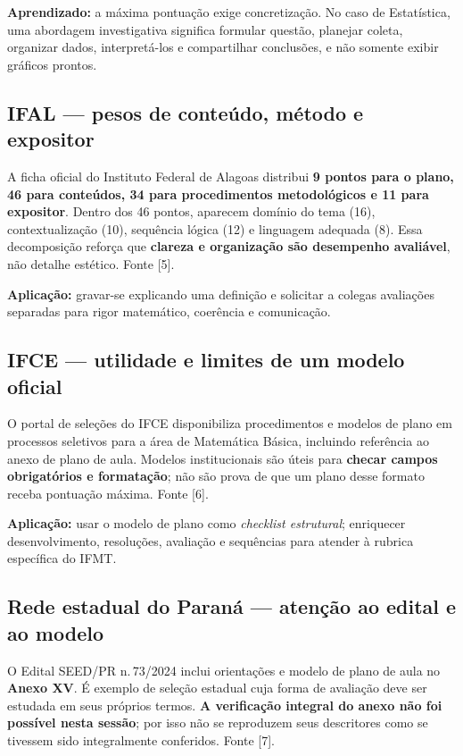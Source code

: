 \documentclass[11pt,a4paper]{article}
\begin{document}
\textbf{Aprendizado:} a máxima pontuação exige concretização. No caso de Estatística, uma abordagem investigativa significa formular questão, planejar coleta, organizar dados, interpretá-los e compartilhar conclusões, e não somente exibir gráficos prontos.

\subsection{IFAL --- pesos de conteúdo, método e expositor}
A ficha oficial do Instituto Federal de Alagoas distribui \textbf{9 pontos para o plano, 46 para conteúdos, 34 para procedimentos metodológicos e 11 para expositor}. Dentro dos 46 pontos, aparecem domínio do tema (16), contextualização (10), sequência lógica (12) e linguagem adequada (8). Essa decomposição reforça que \textbf{clareza e organização são desempenho avaliável}, não detalhe estético. Fonte [5].

\textbf{Aplicação:} gravar-se explicando uma definição e solicitar a colegas avaliações separadas para rigor matemático, coerência e comunicação.

\subsection{IFCE --- utilidade e limites de um modelo oficial}
O portal de seleções do IFCE disponibiliza procedimentos e modelos de plano em processos seletivos para a área de Matemática Básica, incluindo referência ao anexo de plano de aula. Modelos institucionais são úteis para \textbf{checar campos obrigatórios e formatação}; não são prova de que um plano desse formato receba pontuação máxima. Fonte [6].

\textbf{Aplicação:} usar o modelo de plano como \textit{checklist estrutural}; enriquecer desenvolvimento, resoluções, avaliação e sequências para atender à rubrica específica do IFMT.

\subsection{Rede estadual do Paraná --- atenção ao edital e ao modelo}\label{sec:parana}
O Edital SEED/PR n.\,73/2024 inclui orientações e modelo de plano de aula no \textbf{Anexo XV}. É exemplo de seleção estadual cuja forma de avaliação deve ser estudada em seus próprios termos. \textbf{A verificação integral do anexo não foi possível nesta sessão}; por isso não se reproduzem seus descritores como se tivessem sido integralmente conferidos. Fonte [7].
\end{document}
